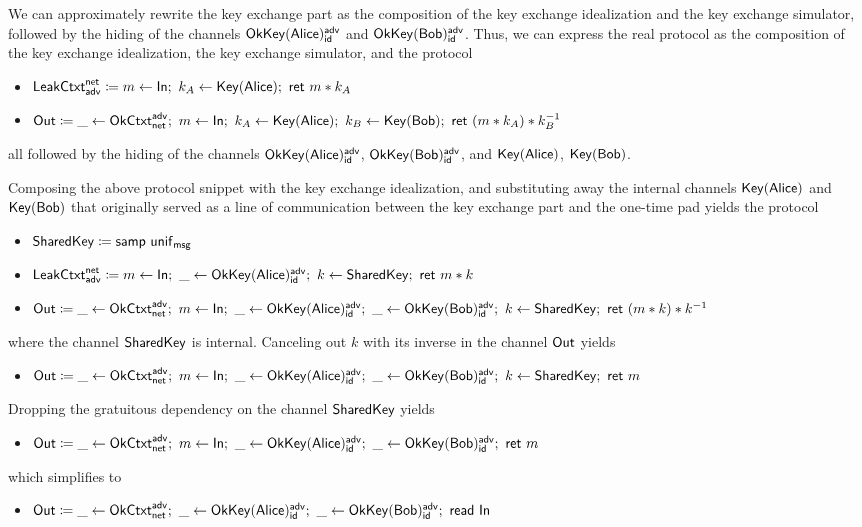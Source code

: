 We can approximately rewrite the key exchange part as the composition of the key exchange idealization and the key exchange simulator, followed by the hiding of the channels $\mathsf{OkKey}(\mathsf{Alice})^{\mathsf{adv}}_{\mathsf{id}}$ and $\mathsf{OkKey}(\mathsf{Bob})^{\mathsf{adv}}_{\mathsf{id}}$. Thus, we can express the real protocol as the composition of the key exchange idealization, the key exchange simulator, and the protocol
\begin{itemize}
\item $\mathsf{LeakCtxt}^{\mathsf{net}}_{\mathsf{adv}} \coloneqq m \leftarrow \mathsf{In}; \ k_A \leftarrow \mathsf{Key}(\mathsf{Alice}); \ \mathsf{ret} \ m * k_A$
\item $\Out \coloneqq \_ \leftarrow \OkCtxt^\adv_\net; \ m \leftarrow \In; \ k_A \leftarrow \Key(\Alice); \ k_B \leftarrow \Key(\Bob); \ \ret{(m * k_A) * k_B^{-1}}$
\end{itemize}
all followed by the hiding of the channels $\mathsf{OkKey}(\mathsf{Alice})^{\mathsf{adv}}_{\mathsf{id}}$, $\mathsf{OkKey}(\mathsf{Bob})^{\mathsf{adv}}_{\mathsf{id}}$, and $\mathsf{Key}(\mathsf{Alice})$, $\mathsf{Key}(\mathsf{Bob})$.

Composing the above protocol snippet with the key exchange idealization, and substituting away the internal channels $\mathsf{Key}(\mathsf{Alice})$ and $\mathsf{Key}(\mathsf{Bob})$ that originally served as a line of communication between the key exchange part and the one-time pad yields the protocol
\begin{itemize}
\item $\mathsf{SharedKey} \coloneqq \mathsf{samp} \ \mathsf{unif}_{\mathsf{msg}}$
\item $\mathsf{LeakCtxt}^{\mathsf{net}}_{\mathsf{adv}} \coloneqq m \leftarrow \mathsf{In}; \ \_ \leftarrow \mathsf{OkKey}(\mathsf{Alice})^{\mathsf{adv}}_{\mathsf{id}}; \ k \leftarrow \mathsf{SharedKey}; \ \mathsf{ret} \ m * k$
\item $\mathsf{Out} \coloneqq \_ \leftarrow \mathsf{OkCtxt}^{\mathsf{adv}}_{\mathsf{net}}; \ m \leftarrow \mathsf{In}; \ \_ \leftarrow \mathsf{OkKey}(\mathsf{Alice})^{\mathsf{adv}}_{\mathsf{id}}; \ \_ \leftarrow \mathsf{OkKey}(\mathsf{Bob})^{\mathsf{adv}}_{\mathsf{id}}; \ k \leftarrow \mathsf{SharedKey}; \ \mathsf{ret} \ (m * k) * k^{-1}$
\end{itemize}
where the channel $\mathsf{SharedKey}$ is internal. Canceling out $k$ with its inverse in the channel $\mathsf{Out}$ yields
\begin{itemize}
\item $\mathsf{Out} \coloneqq \_ \leftarrow \mathsf{OkCtxt}^{\mathsf{adv}}_{\mathsf{net}}; \ m \leftarrow \mathsf{In}; \ \_ \leftarrow \mathsf{OkKey}(\mathsf{Alice})^{\mathsf{adv}}_{\mathsf{id}}; \ \_ \leftarrow \mathsf{OkKey}(\mathsf{Bob})^{\mathsf{adv}}_{\mathsf{id}}; \ k \leftarrow \mathsf{SharedKey}; \ \mathsf{ret} \ m$
\end{itemize}
Dropping the gratuitous dependency on the channel $\mathsf{SharedKey}$ yields
\begin{itemize}
\item $\Out \coloneqq \_ \leftarrow \OkCtxt^\adv_\net; \ m \leftarrow \In; \ \_ \leftarrow \OkKey(\Alice)^\adv_\id; \ \_ \leftarrow \OkKey(\Bob)^\adv_\id; \ \ret{m}$
\end{itemize}
which simplifies to
\begin{itemize}
\item $\mathsf{Out} \coloneqq \_ \leftarrow \mathsf{OkCtxt}^{\mathsf{adv}}_{\mathsf{net}}; \ \_ \leftarrow \mathsf{OkKey}(\mathsf{Alice})^{\mathsf{adv}}_{\mathsf{id}}; \ \_ \leftarrow \mathsf{OkKey}(\mathsf{Bob})^{\mathsf{adv}}_{\mathsf{id}}; \ \mathsf{read} \ \mathsf{In}$
\end{itemize}

